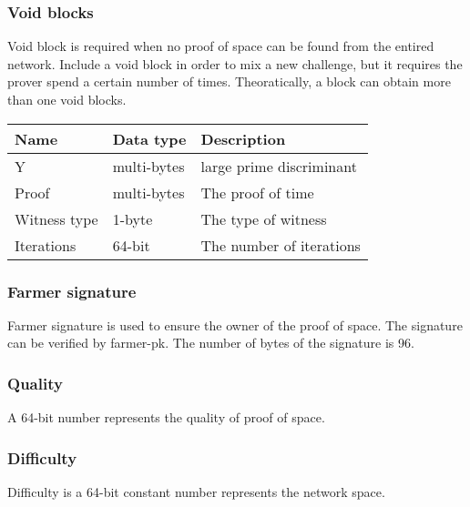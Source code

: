 \subsubsection{Void blocks}
\begin{flushleft}
    Void block is required when no proof of space can be found from the entired network. Include a void block in order to mix a new challenge, but it requires the prover spend a certain number of times. Theoratically, a block can obtain more than one void blocks.
\end{flushleft}
\begin{tabular}{ |p{3cm}|p{3cm}|p{6cm}| }
    \hline
    \rowcolor{lightgray}\textbf{Name} & \textbf{Data type} & \textbf{Description} \\[5pt]
    \hline
    Y & multi-bytes & large prime discriminant \\[5pt]
    \rowcolor{lightgray!30} Proof & multi-bytes & The proof of time \\[5pt]
    Witness type & 1-byte & The type of witness \\[5pt]
    \rowcolor{lightgray!30} Iterations & 64-bit & The number of iterations \\[5pt]
    \hline
\end{tabular}
\subsubsection{Farmer signature}
\begin{flushleft}
    Farmer signature is used to ensure the owner of the proof of space. The signature can be verified by farmer-pk. The number of bytes of the signature is 96.
\end{flushleft}
\subsubsection{Quality}
\begin{flushleft}
    A 64-bit number represents the quality of proof of space.
\end{flushleft}
\subsubsection{Difficulty}
\begin{flushleft}
    Difficulty is a 64-bit constant number represents the network space.
\end{flushleft}
